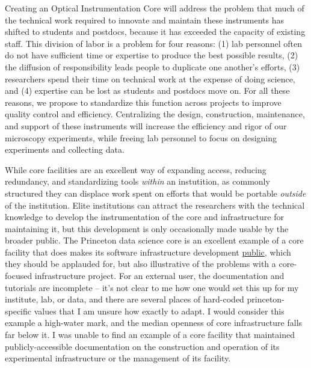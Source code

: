 \begin{leftbar}
Creating an Optical Instrumentation Core will address the problem that
much of the technical work required to innovate and maintain these
instruments has shifted to students and postdocs, because it has
exceeded the capacity of existing staff. This division of labor is a
problem for four reasons: (1) lab personnel often do not have sufficient
time or expertise to produce the best possible results, (2) the
diffusion of responsibility leads people to duplicate one another's
efforts, (3) researchers spend their time on technical work at the
expense of doing science, and (4) expertise can be lost as students and
postdocs move on. For all these reasons, we propose to standardize this
function across projects to improve quality control and efficiency.
Centralizing the design, construction, maintenance, and support of these
instruments will increase the efficiency and rigor of our microscopy
experiments, while freeing lab personnel to focus on designing
experiments and collecting data.
\end{leftbar}

While core facilities are an excellent way of expanding access, reducing
redundancy, and standardizing tools \emph{within} an instutition, as
commonly structured they can displace work spent on efforts that would
be portable \emph{outside} of the institution. Elite institutions can
attract the researchers with the technical knowledge to develop the
instrumentation of the core and infrastructure for maintaining it, but
this development is only occasionally made usable by the broader public.
The Princeton data science core is an excellent example of a core
facility that does makes its software infrastructure development
\href{https://github.com/BrainCOGS}{public}, which they should be applauded for, but also
illustrative of the problems with a core-focused infrastructure project.
For an external user, the documentation and tutorials are incomplete --
it's not clear to me how one would set this up for my institute, lab, or
data, and there are several places of hard-coded princeton-specific
values that I am unsure how exactly to adapt. I would
consider this example a high-water mark, and the median openness of core
infrastructure falls far below it. I was unable to find an example of a
core facility that maintained publicly-accessible documentation on the
construction and operation of its experimental infrastructure or the
management of its facility.

